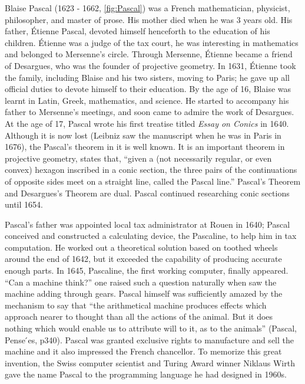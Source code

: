 \documentclass[b5paper]{article}
\begin{document}
\begin{mdframed}
Blaise Pascal (1623 - 1662, \cref{fig:Pascal}) was a French mathematician, physicist, philosopher, and master of prose. His mother died when he was 3 years old. His father, Étienne Pascal, devoted himself henceforth to the education of his children. Étienne was a judge of the tax court, he was interesting in mathematics and belonged to Mersenne's circle. Through Mersenne, Étienne became a friend of Desargues, who was the founder of projective geometry. In 1631, Étienne took the family, including Blaise and his two sisters, moving to Paris; he gave up all official duties to devote himself to their education. By the age of 16, Blaise was learnt in Latin, Greek, mathematics, and science. He started to accompany his father to Mersenne's meetings, and soon came to admire the work of Desargues. At the age of 17, Pascal wrote his first treatise titled \emph{Essay on Conics} in 1640. Although it is now lost (Leibniz saw the manuscript when he was in Paris in 1676), the Pascal's theorem in it is well known. It is an important theorem in projective geometry, states that, \enquote{given a (not necessarily regular, or even convex) hexagon inscribed in a conic section, the three pairs of the continuations of opposite sides meet on a straight line, called the Pascal line.} Pascal's Theorem and Desargues's Theorem are dual. Pascal continued researching conic sections until 1654.

Pascal's father was appointed local tax administrator at Rouen in 1640; Pascal conceived and constructed a calculating device, the Pascaline, to help him in tax computation. He worked out a theoretical solution based on toothed wheels around the end of 1642, but it exceeded the capability of producing accurate enough parts. In 1645, Pascaline, the first working computer, finally appeared. \enquote{Can a machine think?} one raised such a question naturally when saw the machine adding through gears. Pascal himself was sufficiently amazed by the mechanism to say that \enquote{the arithmetical machine produces effects which approach nearer to thought than all the actions of the animal. But it does nothing which would enable us to attribute will to it, as to the animals} (Pascal, Pense ́es, p340). Pascal was granted exclusive rights to manufacture and sell the machine and it also impressed the French chancellor. To memorize this great invention, the Swiss computer scientist and Turing Award winner Niklaus Wirth gave the name Pascal to the programming language he had designed in 1960s.


\end{mdframed}
\end{document}
